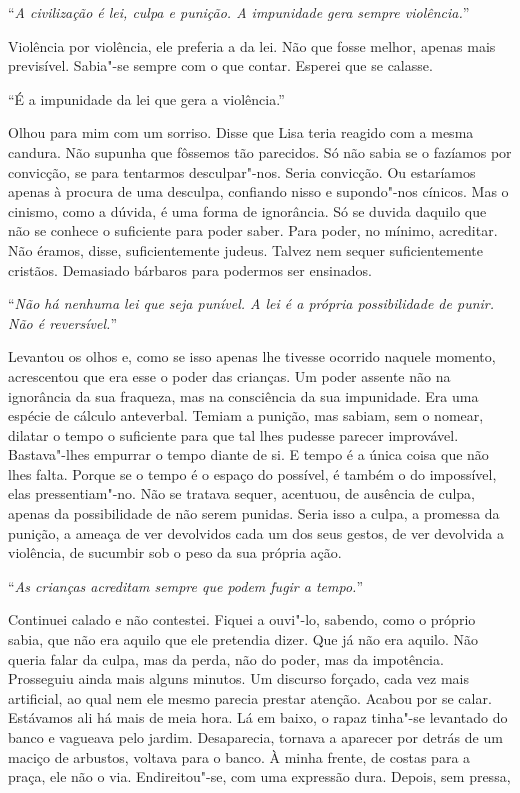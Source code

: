 ``\emph{A civilização é lei, culpa e punição. A impunidade gera sempre
violência.}''

Violência por violência, ele preferia a da lei. Não que fosse melhor,
apenas mais previsível. Sabia"-se sempre com o que contar. Esperei que
se calasse.

``É a impunidade da lei que gera a violência.''

Olhou para mim com um sorriso. Disse que Lisa teria reagido com a mesma
candura. Não supunha que fôssemos tão parecidos. Só não sabia se o
fazíamos por convicção, se para tentarmos desculpar"-nos. Seria
convicção. Ou estaríamos apenas à procura de uma desculpa, confiando
nisso e supondo"-nos cínicos. Mas o cinismo, como a dúvida, é uma forma
de ignorância. Só se duvida daquilo que não se conhece o suficiente para
poder saber. Para poder, no mínimo, acreditar. Não éramos, disse,
suficientemente judeus. Talvez nem sequer suficientemente cristãos.
Demasiado bárbaros para podermos ser ensinados.

``\emph{Não há nenhuma lei que seja punível. A lei é a própria
possibilidade de punir. Não é reversível.}''

Levantou os olhos e, como se isso apenas lhe tivesse ocorrido naquele
momento, acrescentou que era esse o poder das crianças. Um poder assente
não na ignorância da sua fraqueza, mas na consciência da sua impunidade.
Era uma espécie de cálculo anteverbal. Temiam a punição, mas sabiam, sem
o nomear, dilatar o tempo o suficiente para que tal lhes pudesse parecer
improvável. Bastava"-lhes empurrar o tempo diante de si. E tempo é a
única coisa que não lhes falta. Porque se o tempo é o espaço do
possível, é também o do impossível, elas pressentiam"-no. Não se tratava
sequer, acentuou, de ausência de culpa, apenas da possibilidade de não
serem punidas. Seria isso a culpa, a promessa da punição, a ameaça de
ver devolvidos cada um dos seus gestos, de ver devolvida a violência, de
sucumbir sob o peso da sua própria ação.

``\emph{As crianças acreditam sempre que podem fugir a tempo.}''

Continuei calado e não contestei. Fiquei a ouvi"-lo, sabendo, como o
próprio sabia, que não era aquilo que ele pretendia dizer. Que já não
era aquilo. Não queria falar da culpa, mas da perda, não do poder, mas
da impotência. Prosseguiu ainda mais alguns minutos. Um discurso
forçado, cada vez mais artificial, ao qual nem ele mesmo parecia prestar
atenção. Acabou por se calar. Estávamos ali há mais de meia hora. Lá em
baixo, o rapaz tinha"-se levantado do banco e vagueava pelo jardim.
Desaparecia, tornava a aparecer por detrás de um maciço de arbustos,
voltava para o banco. À minha frente, de costas para a praça, ele não o
via. Endireitou"-se, com uma expressão dura. Depois, sem pressa,

